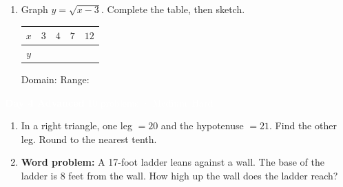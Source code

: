 \documentclass[11pt]{article}
\newcommand{\dayhdr}[3]{%
  \newpage
  \noindent\colorbox{#2}{\parbox{\linewidth}{%
    \vspace{6pt}\hspace{8pt}
    {\LARGE\textbf{\textcolor{white}{#1}}}
    \hfill
    {\normalsize\textcolor{white}{#3}}
    \vspace{6pt}
  }}
  \vspace{4pt}
}
\newcommand{\sechdr}[2]{%
  \vspace{8pt}
  \noindent\colorbox{#2}{\parbox{\linewidth}{%
    \vspace{3pt}\hspace{6pt}{\normalsize\textbf{\textcolor{white}{#1}}}\vspace{3pt}
  }}
  \vspace{4pt}
}
\newcommand{\ws}{\vspace{2.2cm}}   %
\newcommand{\wsl}{\vspace{3cm}}    %
\begin{document}
\begin{enumerate}[label=\textbf{\arabic*.}, start=10, itemsep=0pt]

  \item Graph $y = \sqrt{x - 3}$. \; Complete the table, then sketch.

  \medskip
  \begin{center}
  \renewcommand{\arraystretch}{2}
  \begin{tabular}{|c|c|c|c|c|}
  \hline
  $x$ & $3$ & $4$ & $7$ & $12$ \\
  \hline
  $y$ & & & & \\
  \hline
  \end{tabular}
  \end{center}

  \medskip
  \begin{center}
  \end{center}

  \noindent Domain: \underline{\hspace{4cm}} \quad Range: \underline{\hspace{4cm}}

\end{enumerate}

\dayhdr{Day 4 \quad Advanced}{day4}{10 problems · Medium--Hard}

\sechdr{Section A: Find the Missing Side Length}{day4}

\begin{enumerate}[label=\textbf{\arabic*.}, itemsep=0pt]

  \item In a right triangle, one leg $= 20$ and the hypotenuse $= 21$. Find the other leg. Round to the nearest tenth.
  \ws

  \item \textbf{Word problem:} A 17-foot ladder leans against a wall. The base of the ladder is 8 feet from the wall. How high up the wall does the ladder reach?
  \wsl

\end{enumerate}
\end{document}
